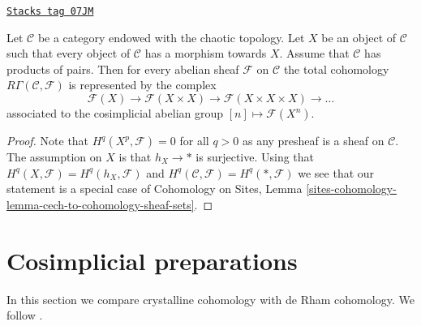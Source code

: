 \begin{lemma}
\label{crystalline-lemma-category-with-covering}
\href{https://stacks.math.columbia.edu/tag/07JM}{\texttt{Stacks tag 07JM}}

Let $\mathcal{C}$ be a category endowed with the chaotic topology.
Let $X$ be an object of $\mathcal{C}$ such that every object of
$\mathcal{C}$ has a morphism towards $X$. Assume that $\mathcal{C}$
has products of pairs.
Then for every abelian sheaf $\mathcal{F}$ on $\mathcal{C}$
the total cohomology $R\Gamma(\mathcal{C}, \mathcal{F})$ is represented
by the complex
$$
\mathcal{F}(X) \to \mathcal{F}(X \times X) \to
\mathcal{F}(X \times X \times X) \to \ldots
$$
associated to the cosimplicial abelian group $[n] \mapsto \mathcal{F}(X^n)$.
\end{lemma}

\begin{proof}
Note that $H^q(X^p, \mathcal{F}) = 0$ for all $q > 0$ as any presheaf is a
sheaf on $\mathcal{C}$. The assumption on $X$ is that $h_X \to *$
is surjective. Using that $H^q(X, \mathcal{F}) = H^q(h_X, \mathcal{F})$ and
$H^q(\mathcal{C}, \mathcal{F}) = H^q(*, \mathcal{F})$ we see that our
statement is a special case of
Cohomology on Sites,
Lemma \ref{sites-cohomology-lemma-cech-to-cohomology-sheaf-sets}.
\end{proof}

\section{Cosimplicial preparations}
\label{crystalline-section-cohomology}
In this section we compare crystalline cohomology with de Rham
cohomology. We follow \cite{Bhatt}.

